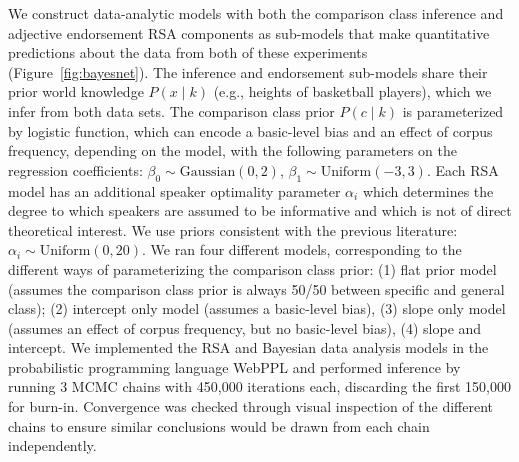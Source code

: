 \documentclass[doc]{apa6}
\begin{document}
We construct data-analytic models with both the comparison class inference and adjective endorsement RSA components as sub-models that make quantitative predictions about the data from both of these experiments (Figure~\ref{fig:bayesnet}).
The inference and endorsement sub-models share their prior world knowledge $P(x \mid k)$ (e.g., heights of basketball players), which we infer from both data sets.
The comparison class prior $P(c \mid k)$ is parameterized by logistic function, which can encode a basic-level bias and an effect of corpus frequency, depending on the model, with the following parameters on the regression coefficients:  $\beta_0 \sim \text{Gaussian}(0, 2)$, $\beta_1 \sim \text{Uniform}(-3, 3)$. 
Each RSA model has an additional speaker optimality parameter $\alpha_{i}$ which determines the degree to which speakers are assumed to be informative and which is not of direct theoretical interest.
We use priors consistent with the previous literature: $\alpha_i \sim \text{Uniform}(0, 20)$.
We ran four different models, corresponding to the different ways of parameterizing the comparison class prior: (1) flat prior model (assumes the comparison class prior is always 50/50 between specific and general class); (2) intercept only model (assumes a basic-level bias), (3) slope only model (assumes an effect of corpus frequency, but no basic-level bias), (4) slope and intercept.
We implemented the RSA and Bayesian data analysis models in the probabilistic programming language WebPPL \cite{dippl} and performed inference by running 3 MCMC chains with 450,000 iterations each, discarding the first 150,000 for burn-in. 
Convergence was checked through visual inspection of the different chains to ensure similar conclusions would be drawn from each chain independently. 

\end{document}
